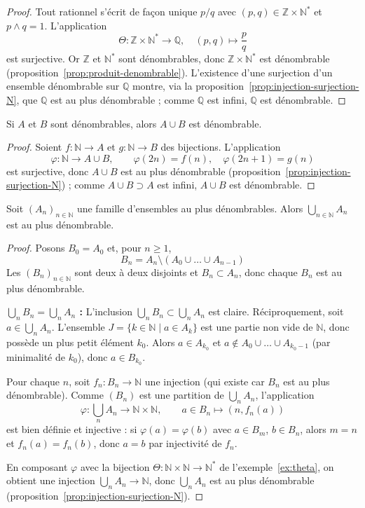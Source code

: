 \begin{proof}
Tout rationnel s'écrit de façon unique $p/q$ avec $(p,q)\in\mathbb{Z}\times\mathbb{N}^*$ et $p\wedge q=1$. L'application
\[\Theta : \mathbb{Z}\times\mathbb{N}^* \to \mathbb{Q}, \quad (p,q)\mapsto \frac{p}{q}\]
est surjective. Or $\mathbb{Z}$ et $\mathbb{N}^*$ sont dénombrables, donc $\mathbb{Z}\times\mathbb{N}^*$ est dénombrable (proposition~\ref{prop:produit-denombrable}). L'existence d'une surjection d'un ensemble dénombrable sur $\mathbb{Q}$ montre, via la proposition~\ref{prop:injection-surjection-N}, que $\mathbb{Q}$ est au plus dénombrable ; comme $\mathbb{Q}$ est infini, $\mathbb{Q}$ est dénombrable.
\end{proof}

\begin{prop}
Si $A$ et $B$ sont dénombrables, alors $A\cup B$ est dénombrable.
\end{prop}

\begin{proof}
Soient $f:\mathbb{N}\to A$ et $g:\mathbb{N}\to B$ des bijections. L'application
\[\varphi:\mathbb{N}\to A\cup B, \qquad \varphi(2n)=f(n),\quad \varphi(2n+1)=g(n)\]
est surjective, donc $A\cup B$ est au plus dénombrable (proposition~\ref{prop:injection-surjection-N}) ; comme $A\cup B \supset A$ est infini, $A\cup B$ est dénombrable.
\end{proof}

\begin{prop}
Soit $(A_n)_{n\in\mathbb{N}}$ une famille d'ensembles au plus dénombrables. Alors $\displaystyle\bigcup_{n\in\mathbb{N}} A_n$ est au plus dénombrable.
\end{prop}

\begin{proof}
Posons $B_0=A_0$ et, pour $n\geq 1$,
\[B_n = A_n \setminus (A_0\cup\dots\cup A_{n-1})\]
Les $(B_n)_{n\in\mathbb{N}}$ sont deux à deux disjoints et $B_n\subset A_n$, donc chaque $B_n$ est au plus dénombrable.

\textbf{$\bigcup_n B_n = \bigcup_n A_n$ :} L'inclusion $\bigcup_n B_n \subset \bigcup_n A_n$ est claire. Réciproquement, soit $a\in\bigcup_n A_n$. L'ensemble $J=\{k\in\mathbb{N} \mid a\in A_k\}$ est une partie non vide de $\mathbb{N}$, donc possède un plus petit élément $k_0$. Alors $a\in A_{k_0}$ et $a\notin A_0\cup\dots\cup A_{k_0-1}$ (par minimalité de $k_0$), donc $a\in B_{k_0}$.

Pour chaque $n$, soit $f_n:B_n\to\mathbb{N}$ une injection (qui existe car $B_n$ est au plus dénombrable). Comme $(B_n)$ est une partition de $\bigcup_n A_n$, l'application
\[\varphi : \bigcup_n A_n \to \mathbb{N}\times\mathbb{N}, \qquad a\in B_n \mapsto (n,f_n(a))\]
est bien définie et injective : si $\varphi(a)=\varphi(b)$ avec $a\in B_m$, $b\in B_n$, alors $m=n$ et $f_n(a)=f_n(b)$, donc $a=b$ par injectivité de $f_n$.

En composant $\varphi$ avec la bijection $\Theta:\mathbb{N}\times\mathbb{N}\to\mathbb{N}^*$ de l'exemple~\ref{ex:theta}, on obtient une injection $\bigcup_n A_n \to \mathbb{N}$, donc $\bigcup_n A_n$ est au plus dénombrable (proposition~\ref{prop:injection-surjection-N}).
\end{proof}

